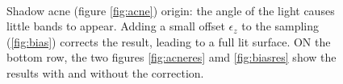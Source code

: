 \begin{figure}
\centering
{}
 \\

\caption{Shadow acne (figure \ref{fig:acne}) origin: the angle of the light causes little bands to appear. Adding a small offset $\epsilon_z$ to the sampling (\ref{fig:bias}) corrects the result, leading to a full lit surface. ON the bottom row, the two figures \ref{fig:acneres} amd \ref{fig:biasres} show the results with and without the correction.}
\label{fig:shadowbias}
\end{figure}


